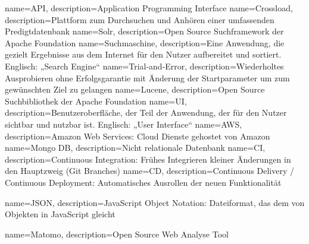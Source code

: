 {
    name={API},
    description={Application Programming Interface}
}
{
    name={Crossload},
    description={Plattform zum Durchsuchen und Anhören einer umfassenden Predigtdatenbank}
}
{
    name={Solr},
    description={Open Source Suchframework der Apache Foundation}
}
{
    name={Suchmaschine},
    description={Eine Anwendung, die gezielt Ergebnisse aus dem Internet für den Nutzer aufbereitet und sortiert. Englisch: „Search Engine“}
}
{
    name={Trial-and-Error},
    description={Wiederholtes Ausprobieren ohne Erfolgsgarantie mit Änderung der Startparameter um zum gewünschten Ziel zu gelangen}
}
{
    name={Lucene},
    description={Open Source Suchbibliothek der Apache Foundation}
}
{
    name={UI},
    description={Benutzeroberfläche, der Teil der Anwendung, der für den Nutzer sichtbar und nutzbar ist. Englisch: „User Interface“}
}
{
    name={AWS},
    description={Amazon Web Services: Cloud Dienste gehostet von Amazon}
}
{
    name={Mongo DB},
    description={Nicht relationale Datenbank}
}
{
    name={CI},
    description={Continuous Integration: Frühes Integrieren kleiner Änderungen in den Hauptzweig (Git Branches)}
}
{
    name={CD},
    description={Continuous Delivery / Continuous Deployment: Automatisches Ausrollen der neuen Funktionalität}
}

{
    name={JSON},
    description={JavaScript Object Notation: Dateiformat, das dem von Objekten in JavaScript gleicht}
}

{
    name={Matomo},
    description={Open Source Web Analyse Tool}
}


\glsaddall
